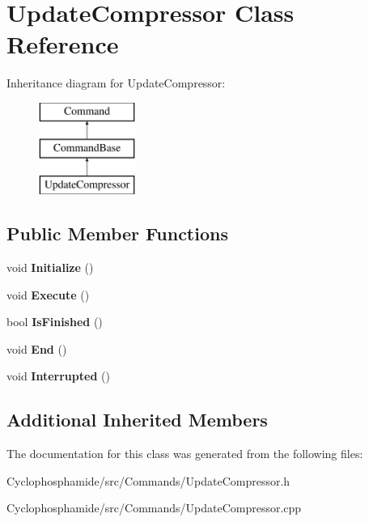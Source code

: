 \hypertarget{class_update_compressor}{}\section{Update\+Compressor Class Reference}
\label{class_update_compressor}
Inheritance diagram for Update\+Compressor\+:\begin{figure}[H]
\begin{center}
\leavevmode
\includegraphics[height=3.000000cm]{class_update_compressor}
\end{center}
\end{figure}
\subsection*{Public Member Functions}
\begin{DoxyCompactItemize}
\item 
\hypertarget{class_update_compressor_aa9b278faa22a0b30d74ba0bf5c283621}{}void {\bfseries Initialize} ()\label{class_update_compressor_aa9b278faa22a0b30d74ba0bf5c283621}

\item 
\hypertarget{class_update_compressor_a1dae416361c23fb33ba08255cf6c5df2}{}void {\bfseries Execute} ()\label{class_update_compressor_a1dae416361c23fb33ba08255cf6c5df2}

\item 
\hypertarget{class_update_compressor_a2a1604f7fff8e360a33f371cd2b9ebb1}{}bool {\bfseries Is\+Finished} ()\label{class_update_compressor_a2a1604f7fff8e360a33f371cd2b9ebb1}

\item 
\hypertarget{class_update_compressor_ac6f4086fde7c7eac4a79cf9b65a58ee5}{}void {\bfseries End} ()\label{class_update_compressor_ac6f4086fde7c7eac4a79cf9b65a58ee5}

\item 
\hypertarget{class_update_compressor_a4fc03700e69bcd8ab2b510e754e9a15d}{}void {\bfseries Interrupted} ()\label{class_update_compressor_a4fc03700e69bcd8ab2b510e754e9a15d}

\end{DoxyCompactItemize}
\subsection*{Additional Inherited Members}


The documentation for this class was generated from the following files\+:\begin{DoxyCompactItemize}
\item 
Cyclophosphamide/src/\+Commands/Update\+Compressor.\+h\item 
Cyclophosphamide/src/\+Commands/Update\+Compressor.\+cpp\end{DoxyCompactItemize}
